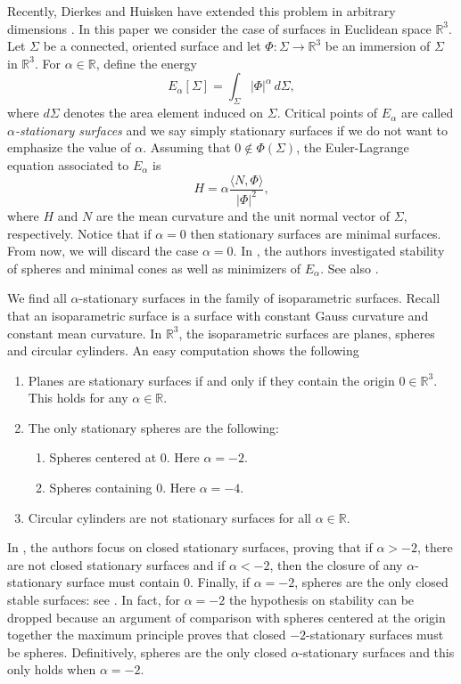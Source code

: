 \documentclass[a4paper,12pt]{amsart}
\theoremstyle{definition}
\def\r{\mathbb R}
\begin{document}
Recently, Dierkes and Huisken have extended this problem in arbitrary dimensions  \cite{dh}. In this paper we consider the case of    surfaces in Euclidean space $\r^3$. Let $\Sigma$ be a connected, oriented surface    and let  $\Phi\colon\Sigma\to\r^3$ be  an immersion of $\Sigma$ in    $\r^3$.  For $\alpha\in\r$, define the energy  
$$E_\alpha[\Sigma]=\int_\Sigma |\Phi|^\alpha\, d\Sigma,$$
where $d\Sigma$ denotes the area element induced on $\Sigma$. Critical points of $E_\alpha$ are called {\it $\alpha$-stationary surfaces} and we say  simply stationary surfaces if we do not want to emphasize the value of $\alpha$. Assuming that  $0\not\in\Phi(\Sigma)$, the Euler-Lagrange equation associated to $E_\alpha$ is  
\begin{equation}\label{eq1}
H=\alpha\frac{\langle N,\Phi\rangle}{|\Phi|^2},
\end{equation}
where $H$ and $N$ are the mean curvature and the unit normal vector of $\Sigma$, respectively. Notice that if $\alpha=0$ then  stationary surfaces are minimal surfaces. From now, we will discard the case $\alpha=0$. In \cite{dh}, the authors  investigated  stability of spheres and minimal cones as well as  minimizers of $E_\alpha$. See also \cite{cx,d4}. 

We find all $\alpha$-stationary surfaces in the family of isoparametric surfaces. Recall that an isoparametric surface is a surface with constant Gauss curvature and constant mean curvature. In $\r^3$, the isoparametric surfaces are   planes, spheres and circular cylinders. An easy computation shows the following 
\begin{enumerate}
\item Planes are stationary surfaces if and only if they contain the origin $0\in\r^3$. This holds for any $\alpha\in\r$.
\item The only stationary spheres  are the following:
\begin{enumerate}
\item    Spheres centered at $0$. Here  $\alpha=-2$.
\item    Spheres containing $0$. Here   $\alpha=-4$.  
\end{enumerate}
\item Circular cylinders are not stationary surfaces for all $\alpha\in\r$.
\end{enumerate}

In \cite{dh}, the authors focus on closed stationary surfaces, proving that if $\alpha>-2$, there are not closed stationary surfaces and if $\alpha<-2$, then the closure of any $\alpha$-stationary surface must contain $0$. Finally, if $\alpha=-2$, spheres are the only closed    stable surfaces: see \cite[Thm. 1.6]{dh}.   In fact, for $\alpha=-2$ the hypothesis on stability can be dropped because an argument of comparison with spheres centered at the origin together the maximum principle proves that   closed $-2$-stationary surfaces must be spheres. Definitively, spheres are the only closed $\alpha$-stationary surfaces and this only holds when $\alpha=-2$.  
\end{document}

